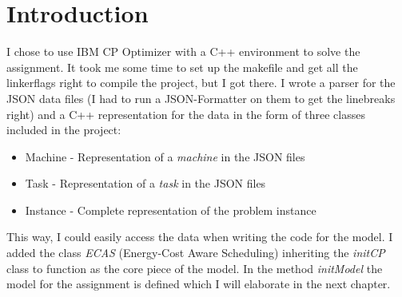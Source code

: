 \section{Introduction}

I chose to use IBM CP Optimizer with a C++ environment to solve the assignment. It took me some time 
to set up the makefile and get all the linkerflags right to compile the project, but I got there. I wrote
a parser for the JSON data files (I had to run a JSON-Formatter on them to get the linebreaks right) and a C++ representation for the data in the form of three classes included in the project: 

\begin{itemize}
	\item Machine - Representation of a \textit{machine} in the JSON files
	\item Task - Representation of a \textit{task} in the JSON files
	\item Instance - Complete representation of the problem instance
\end{itemize}

This way, I could easily access the data when writing the code for the model. I added the class \textit{ECAS} (Energy-Cost Aware Scheduling) inheriting the \textit{initCP} class to function as the core piece of the model. In the method \textit{initModel} the model for the assignment is defined which I will elaborate in the next chapter.
